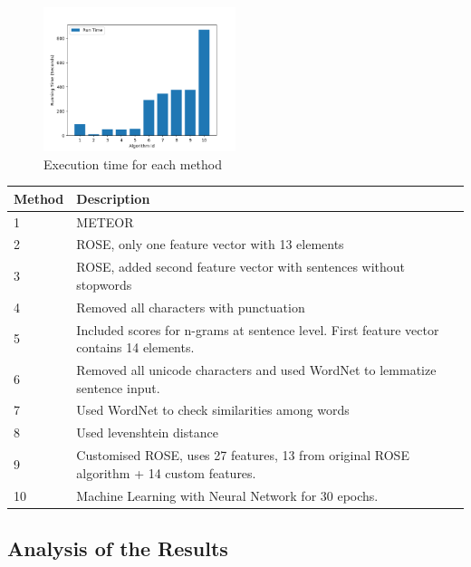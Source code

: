 \documentclass[11pt,letterpaper]{article}
\begin{document}
\begin{figure}
  \caption{Execution time for each method}
    \includegraphics[width=0.5\textwidth]{Figure_2}
\end{figure}


\begin{center}
	\begin{tabular}{| l | p{6cm} |}
	\hline
	Method & Description \\ \hline
	1 & METEOR \\ \hline
	2 & ROSE, only one feature vector with 13 elements \\ \hline
	3 & ROSE, added second feature vector with sentences without stopwords \\ \hline
	4 & Removed all characters with punctuation \\ \hline
	5 & Included scores for n-grams at sentence level. First feature vector contains 14 elements.  \\ \hline
	6 & Removed all unicode characters and used WordNet to lemmatize sentence input. \\ \hline
	7 & Used WordNet to check similarities among words \\ \hline
	8 & Used levenshtein distance \\ \hline
	9 & Customised ROSE, uses 27 features, 13 from original ROSE algorithm + 14 custom features.  \\ \hline
	10 & Machine Learning with Neural Network for 30 epochs.  \\ \hline
	\end{tabular}
\end{center}

\subsection{Analysis of the Results}
\end{document}
